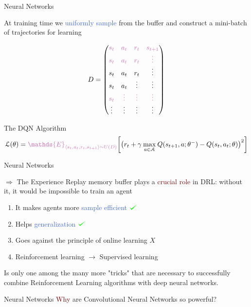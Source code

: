 \documentclass{beamer}
\def\checkmark{\tikz\fill[scale=0.4](0,.35) -- (.25,0) -- (1,.7) -- (.25,.15) -- cycle;}
\begin{document}
\begin{frame}{Neural Networks}

	At training time we \textcolor{RoyalBlue}{uniformly sample} from the buffer and construct a \textcolor{skymagenta}{mini-batch} of trajectories for learning
	
	\begin{equation*}
		D = 
		\begin{pmatrix}
			\textcolor{skymagenta}{s_t} & \textcolor{skymagenta}{a_t} & \textcolor{skymagenta}{r_t} & \textcolor{skymagenta}{s_{t+1}} \\
			\textcolor{skymagenta}{s_t} & \textcolor{skymagenta}{a_t} & \textcolor{skymagenta}{r_t} & \textcolor{skymagenta}{\vdots} \\
			s_t & a_t & r_t & \vdots \\
			s_t & a_t & \vdots & \vdots \\
			\textcolor{skymagenta}{s_t} & \textcolor{skymagenta}{\vdots} & \textcolor{skymagenta}{\vdots} & \textcolor{skymagenta}{\vdots} \\
			\vdots & \vdots & \vdots & \vdots \\
		\end{pmatrix}
	\end{equation*}

	\begin{block}{The DQN Algorithm}
		\begin{multline*}
			\mathcal{L}(\theta) = \textcolor{skymagenta}{\mathds{E}_{\langle s_{t},a_{t},r_{t},s_{t+1}\rangle\sim U(D)}} \bigg[\big(r_{t} + \gamma \: \underset{a\in \mathcal{A}}{\max}\: Q(s_{t+1}, a; \theta^{-}) - Q(s_{t}, a_{t}; \theta) \big)^{2}\bigg]
		\end{multline*}
	\end{block}

\end{frame}

\begin{frame}{Neural Networks}

	$\Rightarrow$ The Experience Replay memory buffer plays a \textcolor{Maroon}{crucial role} in DRL: without it, it would be impossible to train an agent

	\bigskip

	\begin{enumerate}
		\item It makes agents more \textcolor{RoyalBlue}{sample efficient} $\textcolor{green}{\checkmark}$
		\item Helps \textcolor{RoyalBlue}{generalization} $\textcolor{green}{\checkmark}$ 
		\item Goes against the principle of online learning $X$
		\item Reinforcement learning $\rightarrow$ Supervised learning
	\end{enumerate}

	\bigskip 

	Is only one among the many more "tricks" that are necessary to successfully combine Reinforcement Learning algorithms with deep neural networks.

\end{frame}




\begin{frame}{Neural Networks}
	\textcolor{Maroon}{Why} are Convolutional Neural Networks so powerful?
\end{frame}

\end{document}
